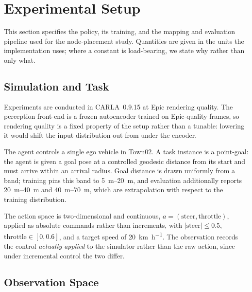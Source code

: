 %
%

\section{Experimental Setup}
\label{sec:setup}

This section specifies the policy, its training, and the mapping and evaluation
pipeline used for the node-placement study. Quantities are given in the units
the implementation uses; where a constant is load-bearing, we state why rather
than only what.

\subsection{Simulation and Task}
\label{sec:setup:task}

Experiments are conducted in CARLA~0.9.15 at Epic rendering quality. The
perception front-end is a frozen autoencoder trained on Epic-quality frames, so
rendering quality is a fixed property of the setup rather than a tunable:
lowering it would shift the input distribution out from under the encoder.

The agent controls a single ego vehicle in Town02. A task instance is a
point-goal: the agent is given a goal pose at a controlled geodesic distance
from its start and must arrive within an arrival radius. Goal distance is drawn
uniformly from a band; training pins this band to \SI{5}{\meter}--\SI{20}{\meter},
and evaluation additionally reports \SI{20}{\meter}--\SI{40}{\meter} and
\SI{40}{\meter}--\SI{70}{\meter}, which are extrapolation with respect to the
training distribution.

The action space is two-dimensional and continuous,
$a = (\mathrm{steer}, \mathrm{throttle})$, applied as absolute commands rather
than increments, with $|\mathrm{steer}| \le 0.5$,
$\mathrm{throttle} \in [0, 0.6]$, and a target speed of \SI{20}{\kilo\meter\per\hour}.
The observation records the control \emph{actually applied} to the simulator
rather than the raw action, since under incremental control the two differ.

\subsection{Observation Space}
\label{sec:setup:obs}

